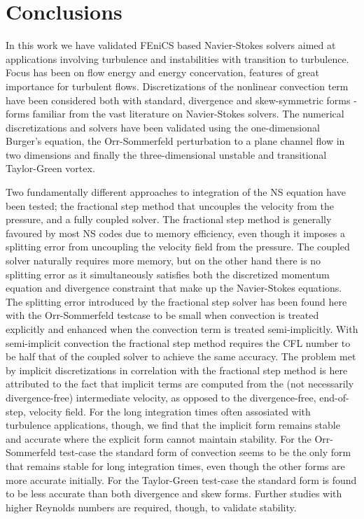 \section{Conclusions}
In this work we have validated FEniCS based Navier-Stokes solvers aimed at applications involving turbulence and instabilities with transition to turbulence. Focus has been on flow energy and energy concervation, features of great importance for turbulent flows. Discretizations of the nonlinear convection term have been considered both with standard, divergence and skew-symmetric forms - forms familiar from the vast literature on Navier-Stokes solvers. The numerical discretizations and solvers have been validated using the one-dimensional Burger's equation, the Orr-Sommerfeld perturbation to a plane channel flow in two dimensions and finally the three-dimensional unstable and transitional Taylor-Green vortex.

Two fundamentally different approaches to integration of the NS equation have been tested; the fractional step method that uncouples the velocity from the pressure, and a fully coupled solver. The fractional step method is generally favoured by most NS codes due to memory efficiency, even though it imposes a splitting error from uncoupling the velocity field from the pressure. The coupled solver naturally requires more memory, but on the other hand there is no splitting error as it simultaneously satisfies both the discretized momentum equation and divergence constraint that make up the Navier-Stokes equations. The splitting error introduced by the fractional step solver has been found here with the Orr-Sommerfeld testcase to be small when convection is treated explicitly and enhanced when the convection term is treated semi-implicitly. With semi-implicit convection the fractional step method requires the CFL number to be half that of the coupled solver to achieve the same accuracy. The problem met by implicit discretizations in correlation with the fractional step method is here attributed to the fact that implicit terms are computed from the (not necessarily divergence-free) intermediate velocity, as opposed to the divergence-free, end-of-step, velocity field. For the long integration times often assosiated with turbulence applications, though, we find that the implicit form remains stable and accurate where the explicit form cannot maintain stability. For the Orr-Sommerfeld test-case the standard form of convection seems to be the only form that remains stable for long integration times, even though the other forms are more accurate initially. For the Taylor-Green test-case the standard form is found to be less accurate than both divergence and skew forms. Further studies with higher Reynolds numbers are required, though, to validate stability.


